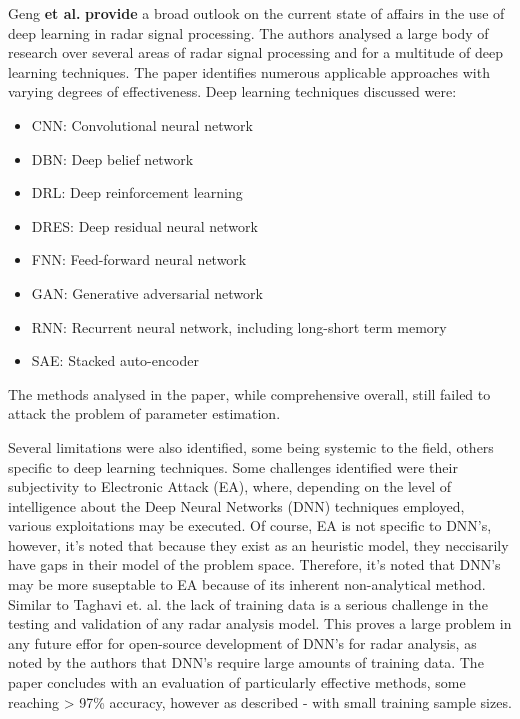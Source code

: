 Geng \textbf{et al.} \cite{mason_deep_2017} \textbf{provide} a broad outlook on the current state of affairs in the use of deep learning in radar signal processing. The authors analysed a large body of research over several areas of radar signal processing and for a multitude of deep learning techniques. The paper identifies numerous applicable approaches with varying degrees of effectiveness. Deep learning techniques discussed were:
\begin{itemize}
    \item CNN: Convolutional neural network
    \item DBN: Deep belief network
    \item DRL: Deep reinforcement learning
    \item DRES: Deep residual neural network
    \item FNN: Feed-forward neural network
    \item GAN: Generative adversarial network
    \item RNN: Recurrent neural network, including long-short term memory
    \item SAE: Stacked auto-encoder
\end{itemize}

The methods analysed in the paper, while comprehensive overall, still failed to attack the problem of parameter estimation. 

Several limitations were also identified, some being systemic to the field, others specific to deep learning techniques. Some challenges identified were their subjectivity to Electronic Attack (EA), where, depending on the level of intelligence about the Deep Neural Networks (DNN) techniques employed, various exploitations may be executed. Of course, EA is not specific to DNN's, however, it's noted that because they exist as an heuristic model, they neccisarily have gaps in their model of the problem space. Therefore, it's noted that DNN's may be more suseptable to EA because of its inherent non-analytical method. Similar to Taghavi et. al. the lack of training data is a serious challenge in the testing and validation of any radar analysis model. This proves a large problem in any future effor for open-source development of DNN's for radar analysis, as noted by the authors that DNN's require large amounts of training data. The paper concludes with an evaluation of particularly effective methods, some reaching > 97\% accuracy, however as described - with small training sample sizes.

